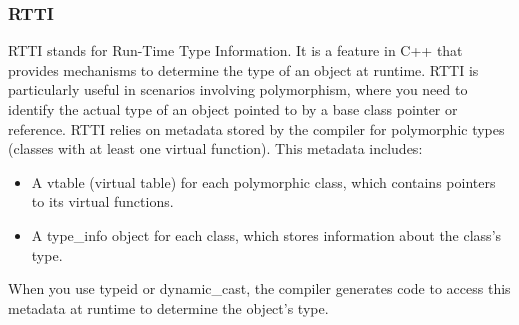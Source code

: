 \documentclass{report}
\begin{document}
    \subsubsection{RTTI}
    \bigbreak \noindent 
    RTTI stands for Run-Time Type Information. It is a feature in C++ that provides mechanisms to determine the type of an object at runtime. RTTI is particularly useful in scenarios involving polymorphism, where you need to identify the actual type of an object pointed to by a base class pointer or reference.
    \bigbreak \noindent 
    RTTI relies on metadata stored by the compiler for polymorphic types (classes with at least one virtual function). This metadata includes:
    \begin{itemize}
        \item A vtable (virtual table) for each polymorphic class, which contains pointers to its virtual functions.
        \item A type\_info object for each class, which stores information about the class's type.
    \end{itemize}
    \bigbreak \noindent 
    When you use typeid or dynamic\_cast, the compiler generates code to access this metadata at runtime to determine the object's type.

    \bigbreak \noindent 
\end{document}
